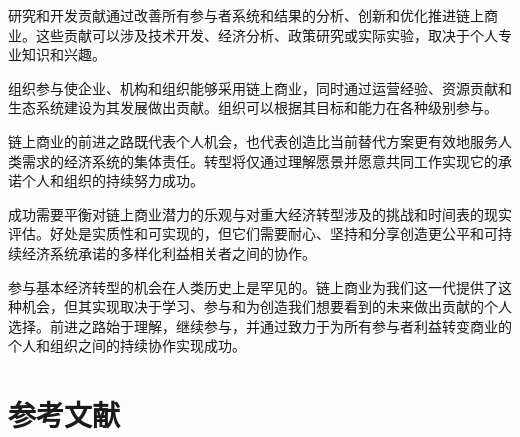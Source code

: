 \documentclass[
  Letterpaper,
]{scrbook}
\begin{document}
研究和开发贡献通过改善所有参与者系统和结果的分析、创新和优化推进链上商业。这些贡献可以涉及技术开发、经济分析、政策研究或实际实验，取决于个人专业知识和兴趣。

组织参与使企业、机构和组织能够采用链上商业，同时通过运营经验、资源贡献和生态系统建设为其发展做出贡献。组织可以根据其目标和能力在各种级别参与。

链上商业的前进之路既代表个人机会，也代表创造比当前替代方案更有效地服务人类需求的经济系统的集体责任。转型将仅通过理解愿景并愿意共同工作实现它的承诺个人和组织的持续努力成功。

成功需要平衡对链上商业潜力的乐观与对重大经济转型涉及的挑战和时间表的现实评估。好处是实质性和可实现的，但它们需要耐心、坚持和分享创造更公平和可持续经济系统承诺的多样化利益相关者之间的协作。

参与基本经济转型的机会在人类历史上是罕见的。链上商业为我们这一代提供了这种机会，但其实现取决于学习、参与和为创造我们想要看到的未来做出贡献的个人选择。前进之路始于理解，继续参与，并通过致力于为所有参与者利益转变商业的个人和组织之间的持续协作实现成功。


\chapter*{参考文献}\label{ux53c2ux8003ux6587ux732e}

\end{document}
